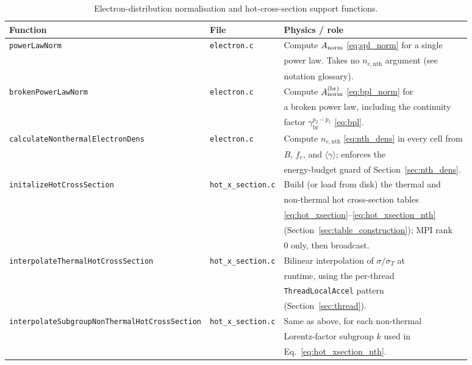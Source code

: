 \documentclass[12pt,a4paper]{article}
\newcommand{\gbr}{\gamma_{\mathrm{br}}}
\newcommand{\nenth}{n_{e,\mathrm{nth}}}
\newcommand{\code}[1]{\texttt{#1}}
\begin{document}
\begin{table}[h]
	\centering
	\caption{Electron-distribution normalisation and hot-cross-section
		support functions.}
	\label{tab:callchain_electron}
	\renewcommand{\arraystretch}{1.4}
	\begin{tabular}{p{} p{} p{}}
		\toprule
		\textbf{Function} & \textbf{File} & \textbf{Physics / role} \\
		\midrule
		\code{powerLawNorm}
		& \code{electron.c}
		& Compute $A_{\rm norm}$ \eqref{eq:spl_norm} for a single \\
		& & power law. Takes no $\nenth$ argument (see \\
		& & notation glossary). \\
		\midrule
		\code{brokenPowerLawNorm}
		& \code{electron.c}
		& Compute $A_{\rm norm}^{\rm (br)}$ \eqref{eq:bpl_norm} for \\
		& & a broken power law, including the continuity \\
		& & factor $\gbr^{p_2-p_1}$ \eqref{eq:bpl}. \\
		\midrule
		\code{calculateNonthermalElectronDens}
		& \code{electron.c}
		& Compute $\nenth$ \eqref{eq:nth_dens} in every cell from \\
		& & $B$, $f_e$, and $\langle\gamma\rangle$; enforces the \\
		& & energy-budget guard of Section~\ref{sec:nth_dens}. \\
		\midrule
		\code{initalizeHotCrossSection}
		& \code{hot\_x\_section.c}
		& Build (or load from disk) the thermal and \\
		& & non-thermal hot cross-section tables \\
		& & \eqref{eq:hot_xsection}--\eqref{eq:hot_xsection_nth} \\
		& & (Section~\ref{sec:table_construction}); MPI rank \\
		& & 0 only, then broadcast. \\
		\midrule
		\code{interpolateThermalHotCrossSection}
		& \code{hot\_x\_section.c}
		& Bilinear interpolation of $\sigma/\sigma_T$ at \\
		& & runtime, using the per-thread \\
		& & \code{ThreadLocalAccel} pattern \\
		& & (Section~\ref{sec:thread}). \\
		\midrule
		\code{interpolateSubgroupNonThermalHotCrossSection}
		& \code{hot\_x\_section.c}
		& Same as above, for each non-thermal \\
		& & Lorentz-factor subgroup $k$ used in \\
		& & Eq.~\eqref{eq:hot_xsection_nth}. \\
		\bottomrule
	\end{tabular}
\end{table}
\end{document}
